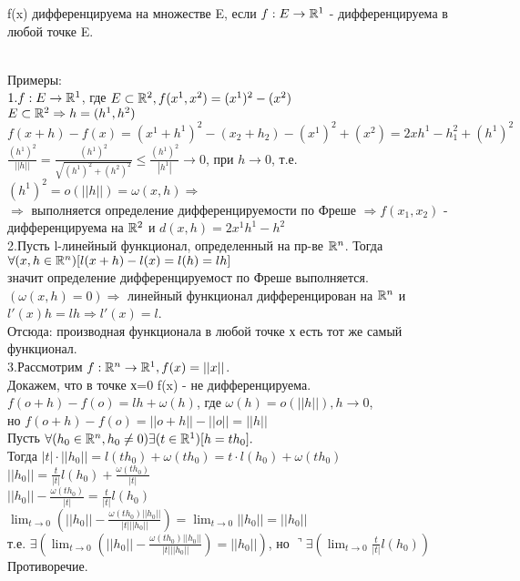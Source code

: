 \begin{opred}
f(x) дифференцируема на множестве E, если $f:E\to\mathbb{R}^1$ - дифференцируема в любой точке E.
\end{opred}
\\
Примеры:
\\
$1.f:E\to\mathbb{R}^1$, где $E \subset\mathbb{R}^2, f(x^1,x^2)=(x^1)^2-(x^2)$
\\
$E \subset \mathbb{R}^2 \Rightarrow h = (h^1,h^2)$
\\
$f(x+h)-f(x)=(x^1+h^1)^2 - (x_2 + h_2) - (x^1)^2 + (x^2) = 2xh^1 - h_1^2 + (h^1)^2$
\\
$\frac{(h^1)^2}{||h||}=\frac{(h^1)^2}{\sqrt{(h^1)^2+(h^2)^2}}\le\frac{(h^1)^2}{|h^1|}\to 0$, при $h\to 0$, т.е.
\\
$(h^1)^2=o(||h||)=\omega(x,h)\Rightarrow$
\\
$\Rightarrow$ выполняется определение дифференцируемости по Фреше $\Rightarrow f(x_1,x_2)$ - дифференцируема на $\mathbb{R}^2$ и $d(x,h) = 2x^1h^1-h^2$
\\
2.Пусть l-линейный функционал, определенный на пр-ве $\mathbb{R}^n$. Тогда 
\\
$\forall(x,h\in\mathbb{R}^n)[l(x+h)-l(x)=l(h)=lh]$
\\
значит определение дифференцируемост по Фреше выполняется.
\\
$(\omega(x,h) = 0)\Rightarrow$ линейный функционал дифференцирован на $\mathbb{R}^n$ и $l'(x)h=lh\Rightarrow l'(x)=l$.
\\
Отсюда: производная функционала в любой точке х есть тот же самый функционал.
\\
3.Рассмотрим $f:\mathbb{R}^n\to\mathbb{R}^1, f(x)=||x||$.
\\
Докажем, что в точке х=0 f(x) - не дифференцируема.
\\
\dokvo
$f(o+h)-f(o)=lh+\omega(h)$, где $\omega(h)=o(||h||), h\to 0$,
\\
но $f(o+h)-f(o)=||o+h||-||o||=||h||$
\\
Пусть $\forall(h_0\in\mathbb{R}^n,h_0 \ne 0)\exists(t\in\mathbb{R}^1)[h=th_0].$
\\
Тогда $|t|\cdot ||h_0||=l(th_0)+\omega(th_0)=t\cdot l(h_0)+\omega(th_0)$
\\
$||h_0||=\frac{t}{|t|}l(h_0)+\frac{\omega(th_0)}{|t|}$
\\
$||h_0||-\frac{\omega(th_0)}{|t|}=\frac{t}{|t|}l(h_0)$
\\
$\lim_{t\to 0} (||h_0||-\frac{\omega (th_0)||h_0||}{|t|||h_0||})=\lim_{t\to 0}||h_0||=||h_0||$
\\
т.е. $\exists(\lim_{t\to 0} (||h_0||-\frac{\omega (th_0)||h_0||}{|t|||h_0||})=||h_0||)$, но $\urcorner\exists(\lim_{t\to 0} \frac{t}{|t|}l(h_0))$ Противоречие.
\\
\dokno









